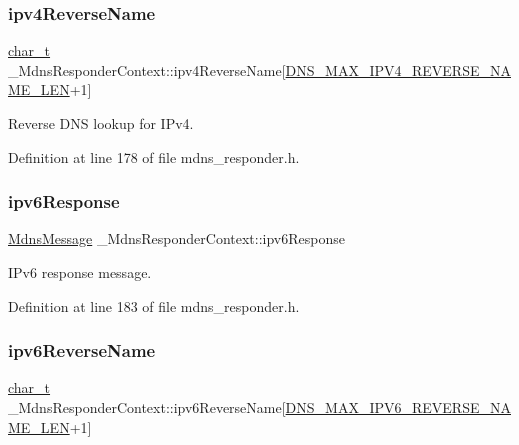 \subsubsection{\texorpdfstring{ipv4\+Reverse\+Name}{ipv4ReverseName}}
{\footnotesize\ttfamily \hyperlink{compiler__port_8h_a40bb5262bf908c328fbcfbe5d29d0201}{char\+\_\+t} \+\_\+\+Mdns\+Responder\+Context\+::ipv4\+Reverse\+Name\mbox{[}\hyperlink{dns__common_8h_a0cc1e67080053e976ed70dc495a12ef6}{D\+N\+S\+\_\+\+M\+A\+X\+\_\+\+I\+P\+V4\+\_\+\+R\+E\+V\+E\+R\+S\+E\+\_\+\+N\+A\+M\+E\+\_\+\+L\+EN}+1\mbox{]}}



Reverse D\+NS lookup for I\+Pv4. 



Definition at line 178 of file mdns\+\_\+responder.\+h.

\mbox{\label{struct__MdnsResponderContext_afdc0707e2c83347da49942bf1a47fc56}} 
\subsubsection{\texorpdfstring{ipv6\+Response}{ipv6Response}}
{\footnotesize\ttfamily \hyperlink{structMdnsMessage}{Mdns\+Message} \+\_\+\+Mdns\+Responder\+Context\+::ipv6\+Response}



I\+Pv6 response message. 



Definition at line 183 of file mdns\+\_\+responder.\+h.

\mbox{\label{struct__MdnsResponderContext_a5f486a77d63fd4487fd773804372b65a}} 
\subsubsection{\texorpdfstring{ipv6\+Reverse\+Name}{ipv6ReverseName}}
{\footnotesize\ttfamily \hyperlink{compiler__port_8h_a40bb5262bf908c328fbcfbe5d29d0201}{char\+\_\+t} \+\_\+\+Mdns\+Responder\+Context\+::ipv6\+Reverse\+Name\mbox{[}\hyperlink{dns__common_8h_a6939038546924e6710db5507081a44fd}{D\+N\+S\+\_\+\+M\+A\+X\+\_\+\+I\+P\+V6\+\_\+\+R\+E\+V\+E\+R\+S\+E\+\_\+\+N\+A\+M\+E\+\_\+\+L\+EN}+1\mbox{]}}



